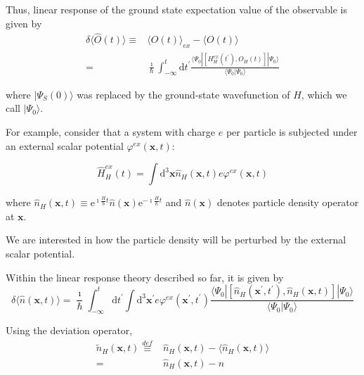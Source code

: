 Thus, linear response of the ground state expectation value of the observable is given by
\begin{equation} \label{3.1.9} \begin{split}
\delta \langle \hat{O}(t) \rangle \equiv& \langle O(t) \rangle_{ex} - \langle O(t) \rangle\\
=& \frac{\imath}{\hbar} \int_{-\infty}^{t} \mathrm{d}t^{'} \frac{\langle \Psi_0 | \left[ H_H^{ex}(t^{'}), O_H(t) \right] | \Psi_0 \rangle}{\langle \Psi_0 | \Psi_0 \rangle}
\end{split}\end{equation}

where $|\Psi_S(0) \rangle$ was replaced by the ground-state wavefunction of $H$, which we call $|\Psi_0 \rangle$.

For example, consider that a system with charge $e$ per particle is subjected under an external scalar potential $\varphi^{ex}(\mathbf{x},t)$:

\begin{equation} \label{Eqs3.1.10}
\hat{H}_H^{ex}(t) = \int \mathrm{d}^3 \mathbf{x} \hat{n}_H(\mathbf{x},t) e \varphi^{ex}(\mathbf{x},t)
\end{equation}

where $\hat{n}_H(\mathbf{x},t) \equiv \mathrm{e}^{\imath \frac{H}{\hbar} t}\hat{n}(\mathbf{x})\mathrm{e}^{-\imath \frac{H}{\hbar}t}$ and $\hat{n}(\mathbf{x})$ denotes particle density operator at $\mathbf{x}$.

We are interested in how the particle density will be perturbed by the external scalar potential.

Within the linear response theory described so far, it is given by
\[\delta \langle \hat{n}(\mathbf{x},t) \rangle = \frac{\imath}{\hbar} \int_{-\infty}^{t}\mathrm{d} t^{'} \int \mathrm{d}^3 \mathbf{x}^{'} e \varphi^{ex}(\mathbf{x}^{'},t^{'}) \frac{\langle \Psi_0 | \left[ \hat{n}_{H}(\mathbf{x}^{'},t^{'}), \hat{n}_H(\mathbf{x},t) \right] | \Psi_0 \rangle}{\langle \Psi_0 | \Psi_0 \rangle}\]

Using the deviation operator,
\begin{equation} \label{Eqs3.1.11} \begin{split}
\tilde{n}_H (\mathbf{x},t) \overset{def}{\equiv}& \hat{n}_H(\mathbf{x},t) - \langle \hat{n}_H(\mathbf{x},t) \rangle\\
=& \hat{n}_H(\mathbf{x},t) - n
\end{split}\end{equation}

